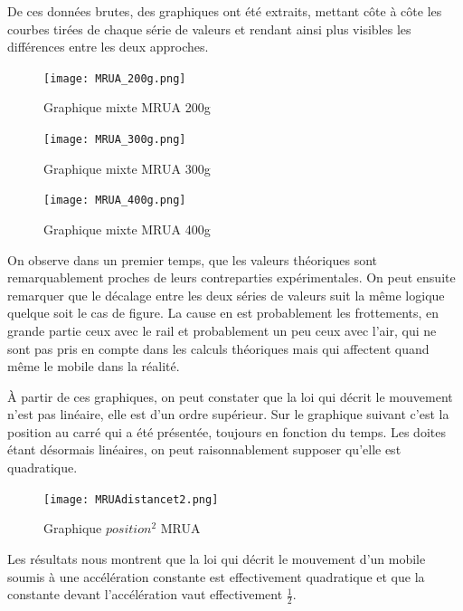 \newpage

De ces données brutes, des graphiques ont été extraits, mettant côte à côte les courbes tirées de chaque série de valeurs et rendant ainsi plus visibles les différences entre les deux approches.

\begin{figure}[h]
    \caption[Graphique mixte MRUA 200g]{Graphique mixte MRUA 200g}
    \centering
    \texttt{[image: MRUA\_200g.png]}
\end{figure}

\begin{figure}[h]
    \caption[Graphique mixte MRUA 300g]{Graphique mixte MRUA 300g}
    \centering
    \texttt{[image: MRUA\_300g.png]}
\end{figure}
\newpage

\begin{figure}[h]
    \caption[Graphique mixte MRUA 400g]{Graphique mixte MRUA 400g}
    \centering
    \texttt{[image: MRUA\_400g.png]}
\end{figure}

On observe dans un premier temps, que les valeurs théoriques sont remarquablement proches de leurs contreparties expérimentales. On peut ensuite remarquer que le décalage entre les deux séries de valeurs suit la même logique quelque soit le cas de figure. La cause en est probablement les frottements, en grande partie ceux avec le rail et probablement un peu ceux avec l'air, qui ne sont pas pris en compte dans les calculs théoriques mais qui affectent quand même le mobile dans la réalité.

À partir de ces graphiques, on peut constater que la loi qui décrit le mouvement n'est pas linéaire, elle est d'un ordre supérieur. Sur le graphique suivant c'est la position au carré qui a été présentée, toujours en fonction du temps. Les doites étant désormais linéaires, on peut raisonnablement supposer qu'elle est quadratique.

\begin{figure}
    \caption[Graphique $position^2$ MRUA]{Graphique $position^2$ MRUA}
    \centering
    \texttt{[image: MRUAdistancet2.png]}
\end{figure}

Les résultats nous montrent que la loi qui décrit le mouvement d'un mobile soumis à une accélération constante est effectivement quadratique et que la constante devant l'accélération vaut effectivement $\frac{1}{2}$.

